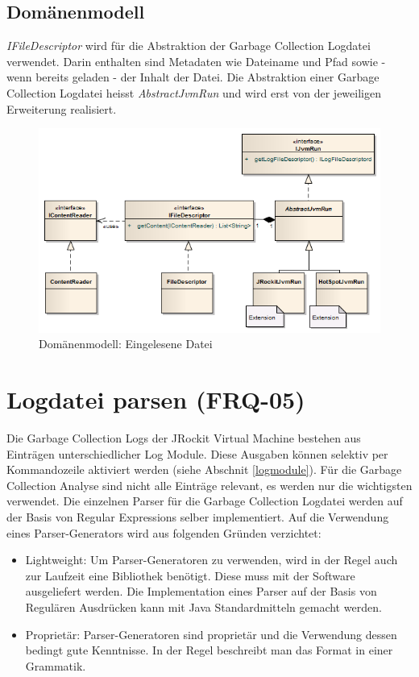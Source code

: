 \subsection{Domänenmodell}
\textit{IFileDescriptor} wird für die Abstraktion der Garbage Collection Logdatei verwendet. Darin enthalten sind Metadaten wie Dateiname und Pfad sowie - wenn bereits geladen - der Inhalt der Datei. Die Abstraktion einer Garbage Collection Logdatei heisst \textit{AbstractJvmRun} und wird erst von der jeweiligen Erweiterung realisiert.
 \begin{figure}[H]
  	\centering
    	\includegraphics[width=16cm]{images/core_domain}
        	\caption{Domänenmodell: Eingelesene Datei}
\end{figure}

\section{Logdatei parsen (FRQ-05)}
Die Garbage Collection Logs der JRockit Virtual Machine bestehen aus Einträgen unterschiedlicher Log Module. Diese Ausgaben können selektiv per Kommandozeile aktiviert werden (siehe Abschnit \ref{logmodule}). Für die Garbage Collection Analyse sind nicht alle Einträge relevant, es werden nur die wichtigsten verwendet. Die einzelnen Parser für die Garbage Collection Logdatei werden auf der Basis von Regular Expressions selber implementiert. Auf die Verwendung eines Parser-Generators wird aus folgenden Gründen verzichtet:
\begin{itemize}
	\item Lightweight: Um Parser-Generatoren zu verwenden, wird in der Regel auch zur Laufzeit eine Bibliothek benötigt. Diese muss mit der Software ausgeliefert werden. Die Implementation eines Parser auf der Basis von Regulären Ausdrücken kann mit Java Standardmitteln gemacht werden.
	\item Proprietär: Parser-Generatoren sind proprietär und die Verwendung dessen bedingt gute Kenntnisse. In der Regel beschreibt man das Format in einer Grammatik.
\end{itemize}

